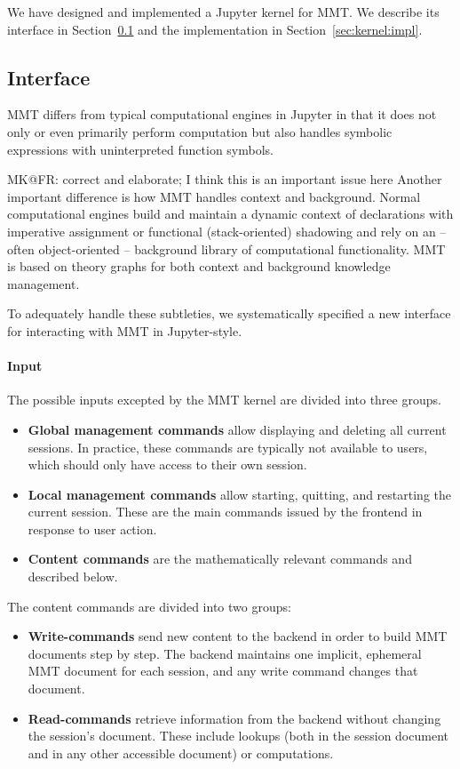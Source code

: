 We have designed and implemented a Jupyter kernel for MMT.
We describe its interface in Section~\ref{sec:kernel:syntax} and the implementation in Section~\ref{sec:kernel:impl}.

\subsection{Interface}\label{sec:kernel:syntax}

MMT differs from typical computational engines in Jupyter in that it does not only or even primarily perform computation but also handles symbolic expressions with uninterpreted function symbols. \begin{newpart}{MK@FR: correct and elaborate; I think this is an important issue here} Another important difference is how MMT handles context and background. Normal computational engines build and maintain a dynamic context of declarations with imperative assignment  or functional (stack-oriented) shadowing and rely on an -- often object-oriented -- background library of computational functionality. MMT is based on theory graphs for both context and background knowledge management. 
\end{newpart}
To adequately handle these subtleties, we systematically specified a new interface for interacting with MMT in Jupyter-style.  

\paragraph{Input}
The possible inputs excepted by the MMT kernel are divided into three groups.
\begin{itemize}
\item \textbf{Global management commands} allow displaying and deleting all current sessions.
 In practice, these commands are typically not available to users, which should only have access to their own session.
\item \textbf{Local management commands} allow starting, quitting, and restarting the current session. These are the main commands issued by the frontend in response to user action.
\item \textbf{Content commands} are the mathematically relevant commands and described below.
\end{itemize}

The content commands are divided into two groups:
\begin{itemize}
 \item \textbf{Write-commands} send new content to the backend in order to build MMT documents step by step.
   The backend maintains one implicit, ephemeral MMT document for each session, and any write command changes that document.
 \item \textbf{Read-commands} retrieve information from the backend without changing the session's document.
   These include lookups (both in the session document and in any other accessible document) or computations.
\end{itemize}

